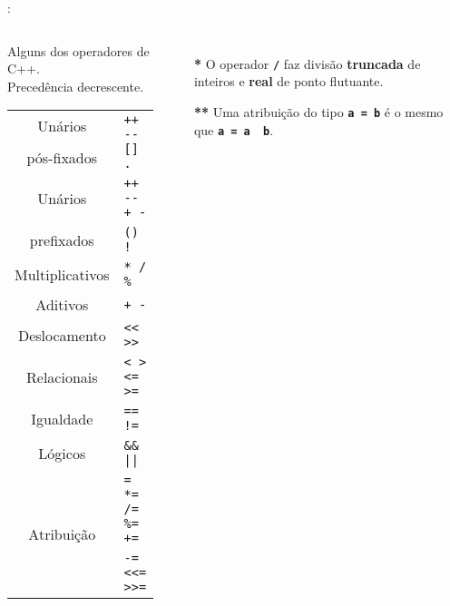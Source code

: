 \begin{frame}{\insertsection: \insertsubsection}

	\begin{columns}[b]
		\begin{block}{\centering Alguns dos operadores de C++.\\{\small Precedência decrescente.}}
			\begin{tabular}{cl}
				Unários      & \multirow{2}{*}{\texttt{++ {-}{-} [] .}}   \\
				pós-fixados  &                                            \\ \hline
				Unários      & \texttt{++ {-}{-} + -}                     \\
				prefixados   & \texttt{(\textbf{\HighlightType{tipo}}) !} \\ \hline
				Multiplicativos\Highlight{*} & \texttt{* / \%}            \\ \hline
				Aditivos     & \texttt{+ -}                               \\ \hline
				Deslocamento & \texttt{{<}{<} {>}{>}}                     \\ \hline
				Relacionais  & \texttt{< > <= >=}                         \\ \hline
				Igualdade    & \texttt{== !=}                             \\ \hline
				Lógicos      & \texttt{\&\& ||}                           \\ \hline
				\multirow{2}{*}{Atribuição\Highlight{**}} & \texttt{= *= /= \%= +=} \\
				             & \texttt{-= <{<}= >{>}=}                    \\ %
			\end{tabular}
		\end{block}

		\begin{itemize}
			\item[\textbf{*}] O operador \textbf{\texttt{/}} faz divisão \textbf{truncada} de inteiros e \textbf{real} de ponto flutuante.
			\item[\textbf{**}] Uma atribuição do tipo \textbf{\texttt{a~=~b}} é o mesmo que \textbf{\texttt{a~=~a~~b}}.
		\end{itemize}
	\end{columns}

\end{frame}

